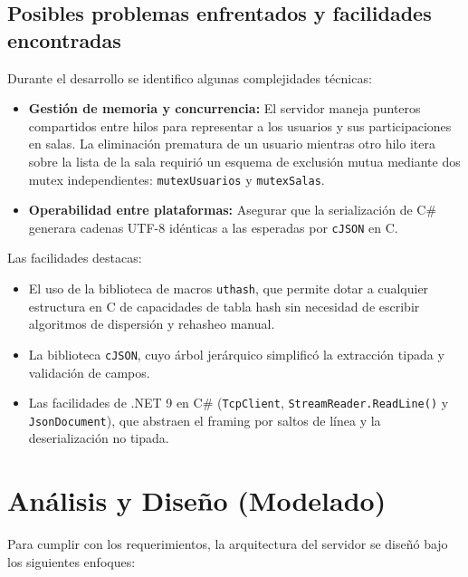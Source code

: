 \documentclass[12pt,a4paper]{article}
\begin{document}
\subsection{Posibles problemas enfrentados y facilidades encontradas}
Durante el desarrollo se identifico algunas complejidades técnicas:
\begin{itemize}
    \item \textbf{Gestión de memoria y concurrencia:} El servidor maneja punteros compartidos entre hilos para representar a los usuarios y sus participaciones en salas. La eliminación prematura de un usuario mientras otro hilo itera sobre la lista de la sala requirió un esquema de exclusión mutua mediante dos mutex independientes: \texttt{mutexUsuarios} y \texttt{mutexSalas}.
    \item \textbf{Operabilidad entre plataformas:} Asegurar que la serialización de C\# generara cadenas UTF-8 idénticas a las esperadas por \texttt{cJSON} en C.
\end{itemize}
Las facilidades destacas:
\begin{itemize}
    \item El uso de la biblioteca de macros \texttt{uthash}, que permite dotar a cualquier estructura en C de capacidades de tabla hash sin necesidad de escribir algoritmos de dispersión y rehasheo manual.
    \item La biblioteca \texttt{cJSON}, cuyo árbol jerárquico simplificó la extracción tipada y validación de campos.
    \item Las facilidades de .NET 9 en C\# (\texttt{TcpClient}, \texttt{StreamReader.ReadLine()} y \texttt{JsonDocument}), que abstraen el framing por saltos de línea y la deserialización no tipada.
\end{itemize}

\section{Análisis y Diseño (Modelado)}
Para cumplir con los requerimientos, la arquitectura del servidor se diseñó bajo los siguientes enfoques:
\end{document}

